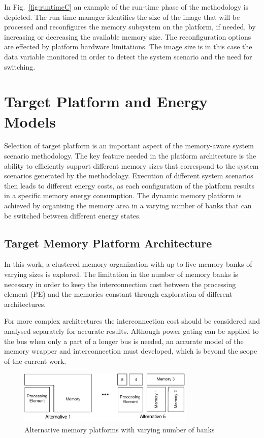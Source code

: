 In Fig.~\ref{fig:runtimeC} an example of the run-time phase of the methodology is depicted. 
The run-time manager identifies the size of the image that will be processed and reconfigures the memory subsystem on the platform, if needed, by increasing or decreasing the available memory size. 
The reconfiguration options are effected by platform hardware limitations. 
The image size is in this case the data variable monitored in order to detect the system scenario and the need for switching.

\section{Target Platform and Energy Models}
\label{sec:platformC}

Selection of target platform is an important aspect of the memory-aware system scenario methodology. 
The key feature needed in the platform architecture is the ability to efficiently support different memory sizes that correspond to the system scenarios generated by the methodology. 
Execution of different system scenarios then leads to different energy costs, as each configuration of the platform results in a specific memory energy consumption. 
The dynamic memory platform is achieved by organising the memory area in a varying number of banks that can be switched between different energy states. 

\subsection{Target Memory Platform Architecture}

In this work, a clustered memory organization with up to five memory banks of varying sizes is explored. 
The limitation in the number of memory banks is necessary in order to keep the interconnection cost between the processing element (PE) and the memories constant through exploration of different architectures. 

For more complex architectures the interconnection cost should be considered and analysed separately for accurate results. 
Although power gating can be applied to the bus when only a part of a longer bus is needed, an accurate model of the memory wrapper and interconnection must developed, which is beyond the scope of the current work. 

\begin{figure}
\centering
\includegraphics[width=0.75\textwidth]{C/platform.pdf}
\caption{Alternative memory platforms with varying number of banks}
\label{fig:platformC}
\end{figure}

